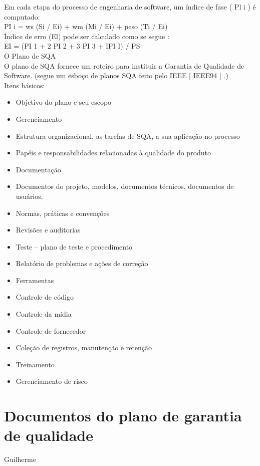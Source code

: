 \documentclass[12pt]{article}
\begin{document}
        Em cada etapa do processo de engenharia de software, um índice de fase ( Pl i ) é computado: \\
        PI i = ws (Si / Ei) + wm (Mi / Ei) + peso (Ti / Ei) \\
        Índice de erro (El) pode ser calculado como se segue : \\
        EI = (PI 1 + 2 PI 2 + 3 PI 3 + IPI I) / PS \\
        O Plano de SQA \\
        O plano de SQA fornece um roteiro para instituir a Garantia de Qualidade de Software. (segue um esboço de planos SQA feito pelo IEEE [ IEEE94 ] .)\\
        Itens básicos: \\
        \begin{itemize}
            \item Objetivo do plano e seu escopo 
            \item Gerenciamento 
            \item Estrutura organizacional, as tarefas de SQA, a sua aplicação no processo
            \item Papéis e responsabilidades relacionadas à qualidade do produto 
            \item Documentação
            \item Documentos do projeto, modelos, documentos técnicos, documentos de usuários. 
            \item 	Normas, práticas e convenções 
            \item Revisões e auditorias 
            \item Teste – plano de teste e procedimento 
            \item Relatório de problemas e ações de correção 
            \item Ferramentas
            \item Controle de código
            \item Controle da mídia 
            \item Controle de fornecedor 
            \item Coleção de registros, manutenção e retenção 
            \item Treinamento
            \item Gerenciamento de risco 
        \end{itemize}
    \section{Documentos do plano de garantia de qualidade}
        Guilherme
\end{document}

